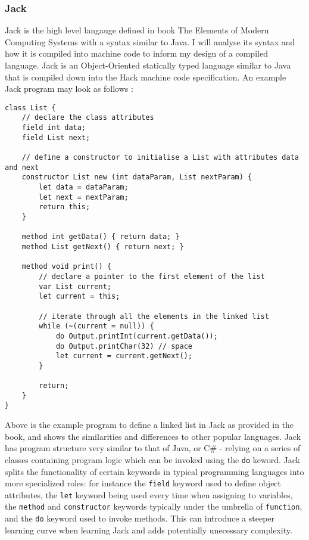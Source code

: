 \subsubsection{Jack}
Jack is the high level langauge defined in book The Elements of Modern Computing Systems \textcite{EOCS} with a syntax similar to Java. I will analyse its syntax and how it is compiled into machine code to inform my design of a compiled language. Jack is an Object-Oriented statically typed language similar to Java that is compiled down into the Hack machine code specification. An example Jack program may look as follows \textcite{EOCS}:
\begin{lstlisting}
class List {
    // declare the class attributes
    field int data;
    field List next;

    // define a constructor to initialise a List with attributes data and next
    constructor List new (int dataParam, List nextParam) {
        let data = dataParam;
        let next = nextParam;
        return this;
    }

    method int getData() { return data; }
    method List getNext() { return next; }

    method void print() {
        // declare a pointer to the first element of the list
        var List current;
        let current = this;

        // iterate through all the elements in the linked list
        while (~(current = null)) {
            do Output.printInt(current.getData());
            do Output.printChar(32) // space
            let current = current.getNext();
        }

        return;
    }
}
\end{lstlisting}


Above is the example program to define a linked list in Jack as provided in the book, and shows the similarities and differences to other popular languages. Jack has program structure very similar to that of Java, or C\# - relying on a series of classes containing program logic which can be invoked using the \texttt{do} keword. Jack splits the functionality of certain keywords in typical programming languages into more specialized roles: for instance the \texttt{field} keyword used to define object attributes, the \texttt{let} keyword being used every time when assigning to variables, the \texttt{method} and \texttt{constructor} keywords typically under the umbrella of \texttt{function}, and the \texttt{do} keyword used to invoke methods. This can introduce a steeper learning curve when learning Jack and adds potentially unecessary complexity.

